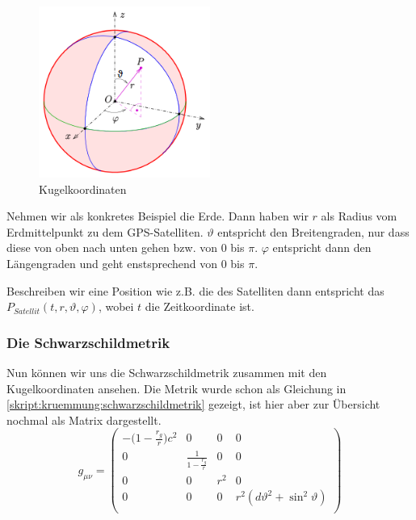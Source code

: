 \begin{refsection}
\begin{figure}[h]
    \centering
    \includegraphics[width=0.5\textwidth]{gps/pictures/kugelkoordinaten.png}
    \caption{Kugelkoordinaten}
\end{figure}

\noindent{}Nehmen wir als konkretes Beispiel die Erde. Dann haben wir $r$ als Radius vom Erdmittelpunkt zu dem GPS-Satelliten. $\vartheta$ entspricht den Breitengraden, nur dass diese von oben nach unten gehen bzw. von 0 bis $\pi$. $\varphi$ entspricht dann den Längengraden und geht enstsprechend von 0 bis $\pi$. 

Beschreiben wir eine Position wie z.B. die des Satelliten dann entspricht das $P_{Satellit}(t,r,\vartheta,\varphi)$, wobei $t$ die Zeitkoordinate ist.

\subsubsection{Die Schwarzschildmetrik}
Nun können wir uns die Schwarzschildmetrik zusammen mit den Kugelkoordinaten ansehen. Die Metrik wurde schon als Gleichung in \eqref{skript:kruemmung:schwarzschildmetrik} gezeigt, ist hier aber zur Übersicht nochmal als Matrix dargestellt. \\

\begin{equation}
g_{\mu\nu}= 
\begin{pmatrix}
-\biggl(1-\frac{r_g}r\biggr)c^2 & 0 & 0 & 0 \\
0 & \frac1{\displaystyle 1-\frac{r_g}r} & 0 & 0 \\
0 & 0 &  r^2 & 0 \\
0 & 0 & 0 & r^2 (d\vartheta^2 + \sin^2\vartheta) \\
\end{pmatrix}
\label{skript:gps:schwarzschildmetrik}
\end{equation} \\


\end{refsection}
